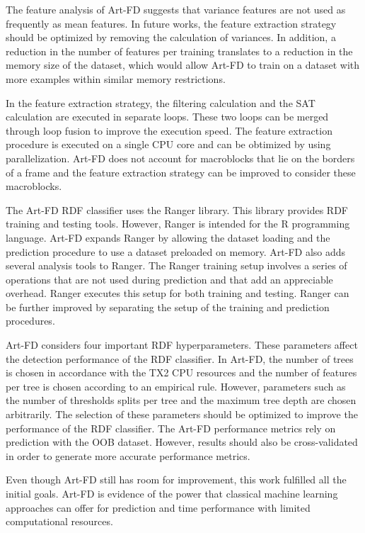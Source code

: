 The feature analysis of Art-FD suggests that variance features are not used as frequently as mean features. In future works, the feature extraction strategy should be optimized by removing the calculation of variances. In addition, a reduction in the number of features per training translates to a reduction in the memory size of the dataset, which would allow Art-FD to train on a dataset with more examples within similar memory restrictions.

In the feature extraction strategy, the filtering calculation and the SAT calculation are executed in separate loops. These two loops can be merged through loop fusion to improve the execution speed. The feature extraction procedure is executed on a single CPU core and can be obtimized by using parallelization. Art-FD does not account for macroblocks that lie on the borders of a frame and the feature extraction strategy can be improved to consider these macroblocks.

The Art-FD RDF classifier uses the Ranger library. This library provides RDF training and testing tools. However, Ranger is intended for the R programming language. Art-FD expands Ranger by allowing the dataset loading and the prediction procedure to use a dataset preloaded on memory. Art-FD also adds several analysis tools to Ranger. The Ranger training setup involves a series of operations that are not used during prediction and that add an appreciable overhead. Ranger executes this setup for both training and testing. Ranger can be further improved by separating the setup of the training and prediction procedures.

Art-FD considers four important RDF hyperparameters. These parameters affect the detection performance of the RDF classifier. In Art-FD, the number of trees is chosen in accordance with the TX2 CPU resources and the number of features per tree is chosen according to an empirical rule. However, parameters such as the number of thresholds splits per tree and the maximum tree depth are chosen arbitrarily. The selection of these parameters should be optimized to improve the performance of the RDF classifier. The Art-FD performance metrics rely on prediction with the OOB dataset. However, results should also be cross-validated in order to generate more accurate performance metrics.

Even though Art-FD still has room for improvement, this work fulfilled all the initial goals. Art-FD is evidence of the power that classical machine learning approaches can offer for prediction and time performance with limited computational resources.
